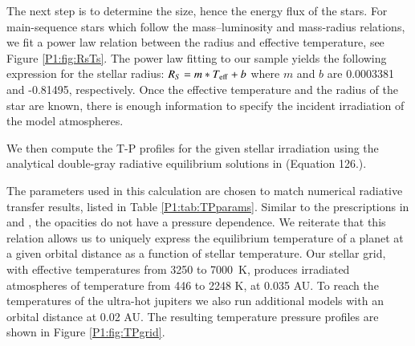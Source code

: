 The next step is to determine the size, hence the energy flux of the stars. For main-sequence stars which follow the mass--luminosity and mass-radius relations, we fit a power law relation between the radius and effective temperature, see Figure \ref{P1:fig:RsTs}. The power law fitting to our sample yields the following expression for the stellar radius: $R_S = m*T_{\rm eff} + b $ where $m$ and $b$ are 0.0003381 and -0.81495, respectively. Once the effective temperature and the radius of the star are known, there is enough information to specify the incident irradiation of the model atmospheres.

We then compute the T-P profiles for the given stellar irradiation using the analytical double-gray radiative equilibrium solutions in \citet{Heng2014} (Equation 126.).

The parameters used in this calculation are chosen to match numerical radiative transfer results, listed in Table \ref{P1:tab:TPparams}.
Similar to the prescriptions in  \citet{Guillot2010} and \citet{Parmentier2014}, the opacities do not have a pressure dependence.
We reiterate that this relation allows us to uniquely express the equilibrium temperature of a planet at a given orbital distance as a function of stellar temperature. Our stellar grid, with effective temperatures from 3250 to 7000~K, produces irradiated atmospheres of temperature from 446 to 2248 K, at 0.035 AU. To reach the temperatures of the ultra-hot jupiters we also run additional models with an orbital distance at 0.02 AU. The resulting temperature pressure profiles are shown in Figure \ref{P1:fig:TPgrid}.

